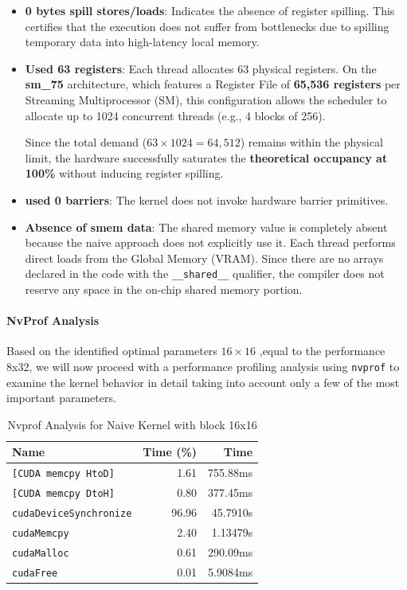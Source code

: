 \begin{itemize}
    \item \textbf{0 bytes spill stores/loads}: Indicates the absence of register spilling. This certifies that the execution does not suffer from bottlenecks due to spilling temporary data into high-latency local memory.
    \item \textbf{Used 63 registers}: Each thread allocates 63 physical registers. On the \textbf{sm\_75} architecture, which features a Register File of \textbf{65,536 registers} per Streaming Multiprocessor (SM), this configuration allows the scheduler to allocate up to 1024 concurrent threads (e.g., 4 blocks of 256). 
    
    Since the total demand ($63 \times 1024 = 64,512$) remains within the physical limit, the hardware successfully saturates the \textbf{theoretical occupancy at 100\%} without inducing register spilling.
    \item \textbf{used 0 barriers}: The kernel does not invoke hardware barrier primitives.
    \item \textbf{Absence of smem data}: The shared memory value is completely absent because the naive approach does not explicitly use it. Each thread performs direct loads from the Global Memory (VRAM). Since there are no arrays declared in the code with the \texttt{\_\_shared\_\_} qualifier, the compiler does not reserve any space in the on-chip shared memory portion.
\end{itemize}

\paragraph{NvProf Analysis} Based on the identified optimal parameters $16 \times 16$ ,equal to the performance 8x32, we will now proceed with a performance profiling analysis using \texttt{nvprof} to examine the kernel behavior in detail taking into account only a few of the most important parameters.

\begin{table}[h]
\centering
\begin{tabular}{lrr}
\toprule
Name & Time (\%) & Time \\
\midrule
\texttt{[CUDA memcpy HtoD]} & 1.61 & 755.88ms \\
\texttt{[CUDA memcpy DtoH]} & 0.80 & 377.45ms \\
\texttt{cudaDeviceSynchronize} & 96.96 & 45.7910s \\
\texttt{cudaMemcpy} & 2.40 & 1.13479s \\
\texttt{cudaMalloc} & 0.61 & 290.09ms \\
\texttt{cudaFree} & 0.01 & 5.9084ms \\
\bottomrule
\end{tabular}
\caption{Nvprof Analysis for Naive Kernel with block 16x16}
\label{tab:nvprof_memory_sync}
\end{table}

